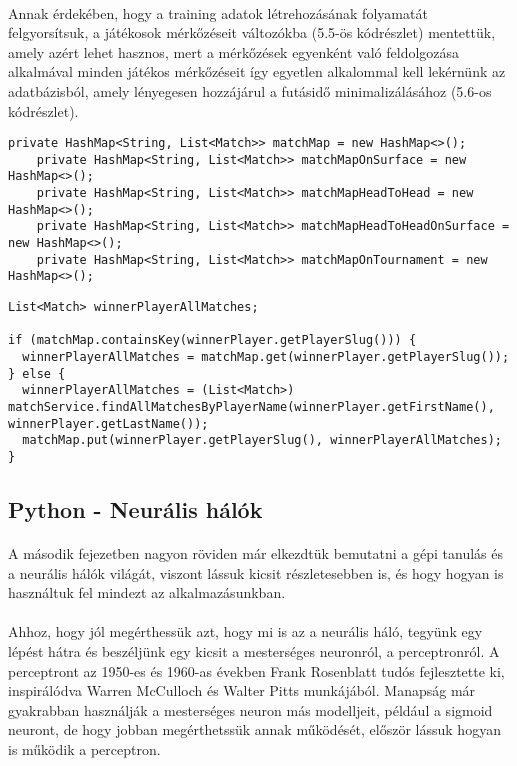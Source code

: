 \paragraph{}
Annak érdekében, hogy a training adatok létrehozásának folyamatát felgyorsítsuk, a játékosok mérkőzéseit változókba (5.5-ös kódrészlet) mentettük, amely azért lehet hasznos, mert a mérkőzések egyenként való feldolgozása alkalmával minden játékos mérkőzéseit így egyetlen alkalommal kell lekérnünk az adatbázisból, amely lényegesen hozzájárul a futásidő minimalizálásához (5.6-os kódrészlet).

\begin{lstlisting}[caption=A futásidő minimalizálásához használt HashMap-ek listája]
    private HashMap<String, List<Match>> matchMap = new HashMap<>();
    private HashMap<String, List<Match>> matchMapOnSurface = new HashMap<>();
    private HashMap<String, List<Match>> matchMapHeadToHead = new HashMap<>();
    private HashMap<String, List<Match>> matchMapHeadToHeadOnSurface = new HashMap<>();
    private HashMap<String, List<Match>> matchMapOnTournament = new HashMap<>();
\end{lstlisting}

\begin{lstlisting}[caption=A győztes játékos meccseinek inicializálása]
List<Match> winnerPlayerAllMatches;

if (matchMap.containsKey(winnerPlayer.getPlayerSlug())) {
  winnerPlayerAllMatches = matchMap.get(winnerPlayer.getPlayerSlug());
} else {
  winnerPlayerAllMatches = (List<Match>) matchService.findAllMatchesByPlayerName(winnerPlayer.getFirstName(), winnerPlayer.getLastName());
  matchMap.put(winnerPlayer.getPlayerSlug(), winnerPlayerAllMatches);
}
\end{lstlisting}

\subsection{Python - Neurális hálók}
\paragraph{}
A második fejezetben nagyon röviden már elkezdtük bemutatni a gépi tanulás és a neurális hálók világát, viszont lássuk kicsit részletesebben is, és hogy hogyan is használtuk fel mindezt az alkalmazásunkban.

\paragraph{}
Ahhoz, hogy jól megérthessük azt, hogy mi is az a neurális háló, tegyünk egy lépést hátra és beszéljünk egy kicsit a mesterséges neuronról, a perceptronról. A perceptront az 1950-es és 1960-as években Frank Rosenblatt tudós fejlesztette ki, inspirálódva Warren McCulloch és Walter Pitts munkájából. Manapság már gyakrabban használják a mesterséges neuron más modelljeit, például a sigmoid neuront, de hogy jobban megérthetssük annak működését, először lássuk hogyan is működik a perceptron.

